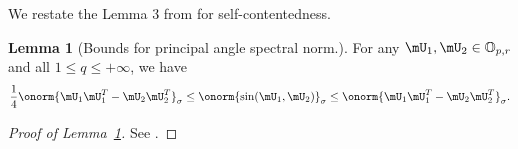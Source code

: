 \documentclass[lettersize,onecolumn,journal]{IEEEtran}
\theoremstyle{definition}
\newtheorem{lem}{Lemma}
\theoremstyle{definition}
\newtheorem{conjecture}{Conjecture}
\newcommand{\of}[1]{\left(#1\right)}
\begin{document}



We restate the Lemma 3 from \cite{zhang2018tensor} for self-contentedness. 
\begin{lem}[Bounds for principal angle spectral norm.]\label{lem:equivalence_qnorm}
    For any $\mU_1, \mU_2 \in \mathbb{O}_{p,r}$ and all $1 \leq q \leq +\infty$, we have
    \begin{align}
        \frac{1}{4} \onorm{\mU_1 \mU_1^T - \mU_2 \mU_2^T}_{\sigma} \leq \onorm{\sin(\mU_1, \mU_2) }_{\sigma} \leq  \onorm{\mU_1 \mU_1^T - \mU_2 \mU_2^T}_{\sigma}.
    \end{align}
\end{lem}

\begin{proof}[Proof of Lemma~\ref{lem:equivalence_qnorm}] See \citet[Proof of Lemma 3]{zhang2018tensor}.
\end{proof}
\end{document}
